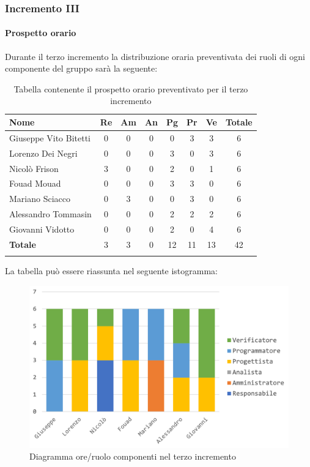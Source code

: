 	
			
		\subsubsection{Incremento III}
			\paragraph{Prospetto orario}
			Durante il terzo incremento la distribuzione oraria preventivata dei ruoli di ogni componente del gruppo sarà la seguente:
			
			\begin{longtable}{|l|c|c|c|c|c|c|c|}
				\hline
				\rowcolor{lighter-grayer}
				\textbf{Nome} & \textbf{Re} & \textbf{Am} & \textbf{An} & \textbf{Pg}  & \textbf{Pr}   & \textbf{Ve} & \textbf{Totale} \\
				\hline
				\endfirsthead
				
				\hline
				Giuseppe Vito Bitetti 		 & 0 & 0 & 0 & 0 & 3 & 3 & 6\\
				\hline
				\hline
				Lorenzo Dei Negri			 & 0 & 0 & 0 & 3 & 0 & 3 & 6\\
				\hline
				\hline
				Nicolò Frison				    & 3 & 0 & 0 & 2 & 0 & 1 & 6\\
				\hline
				\hline
				Fouad Mouad 				 & 0 & 0 & 0 & 3 & 3 & 0 & 6\\
				\hline
				\hline
				Mariano Sciacco 			 & 0 & 3 & 0 & 0 & 3 & 0 & 6\\
				\hline
				\hline
				Alessandro Tommasin     & 0 & 0 & 0 & 2 & 2 & 2 & 6\\
				\hline
				\hline
				Giovanni Vidotto 			 & 0 & 0 & 0 & 2 & 0 & 4 & 6\\
				\hline 
				\textbf{Totale}			 		& 3 & 3 & 0 & 12 & 11 & 13 & 42\\
				\hline
				\caption{Tabella contenente il prospetto orario preventivato per il terzo incremento}
			\end{longtable}
			\pagebreak
			
			La tabella può essere riassunta nel seguente istogramma:
			\begin{figure}[H]
				\centering
				\includegraphics[width=0.8\linewidth]{./images/preventivo/incremento3-1.png}
				\caption{Diagramma ore/ruolo componenti nel terzo incremento}
				\label{fig:diagramma suddivione ruoli incremento III}
			\end{figure}
			
